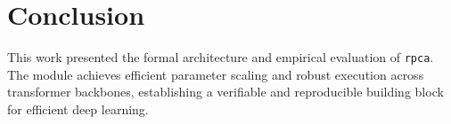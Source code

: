 \section{Conclusion}
This work presented the formal architecture and empirical evaluation of \texttt{rpca}. The module achieves efficient parameter scaling and robust execution across transformer backbones, establishing a verifiable and reproducible building block for efficient deep learning.
